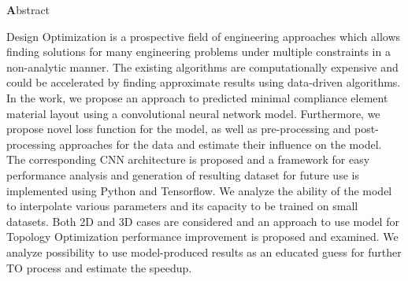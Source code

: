 
\clearemptydoublepage
{}
{}

\vspace*{2cm}
\begin{center}
{\Large \textbf Abstract}
\end{center}
\vspace{1cm}

Design Optimization is a prospective field of engineering approaches which allows finding solutions for many engineering problems under multiple constraints in a non-analytic manner.
The existing algorithms are computationally expensive and could be accelerated by finding approximate results using data-driven algorithms.
In the work, we propose an approach to predicted minimal compliance element material layout using a convolutional neural network model.
Furthermore, we propose novel loss function for the model, as well as pre-processing and post-processing approaches for the data and estimate their influence on the model.
The corresponding CNN architecture is proposed and a framework for easy performance analysis and generation of resulting dataset for future use is implemented using Python and Tensorflow.
We analyze the ability of the model to interpolate various parameters and its capacity to be trained on small datasets.
Both 2D and 3D cases are considered and an approach to use model for Topology Optimization performance improvement is proposed and examined.
We analyze possibility to use model-produced results as an educated guess for further TO process and estimate the speedup.


